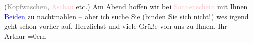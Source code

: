                   (\textcolor{gray}{Kopfwaschen}, \textcolor{pink}{Aschau}{}\ledrightnote{\textcolor{pink}{Aschau}} etc.)
               Am Abend hoffen wir bei \textcolor{pink}{Sonnenschein}{}\ledrightnote{\textcolor{pink}{Restaurant Sonnenschein}} mit Ihnen \textcolor{blue}{Beiden}{}\ledrightnote{\textcolor{blue}{Paula Beer-Hofmann}} zu nachtmahlen – aber ich suche Sie (binden
               Sie sich nicht!) {\pb}we{\geminationn}s
               irgend geht schon vorher auf. Herzlichst und viele Grüße von uns zu Ihnen.\pend
           \pstart
           Ihr{\\[\baselineskip]}\spacefill\mbox{Arthur}\pend
           \leftskip=0em{}\endnumbering{}  
      